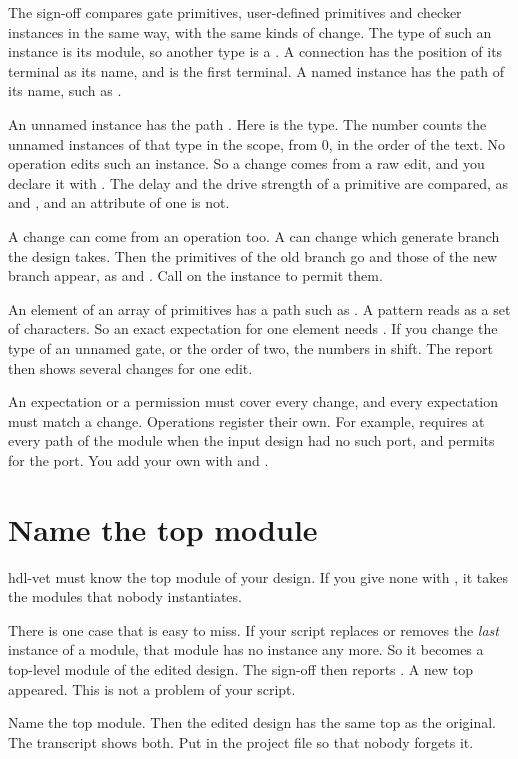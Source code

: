 The sign-off compares gate primitives, user-defined primitives and checker instances in
the same way, with the same kinds of change. The type of such an instance is its module,
so another type is a . A connection has the position of its terminal
as its name, and  is the first terminal. A named instance has the path of its
name, such as .

An unnamed instance has the path . Here  is the type. The
number counts the unnamed instances of that type in the scope, from 0, in the order of the
text. No operation edits such an instance. So a change comes from a raw edit, and you
declare it with . The delay and the drive strength of a primitive are
compared, as  and , and an attribute of
one is not.

A change can come from an operation too. A  can change which
generate branch the design takes. Then the primitives of the old branch go and those of the
new branch appear, as  and . Call
 on the instance to permit them.

An element of an array of primitives has a path such as . A pattern reads
\code{[0]} as a set of characters. So an exact expectation for one element needs
. If you change the type of an unnamed gate, or the order of two, the
numbers in  shift. The report then shows several changes for one edit.

An expectation or a permission must cover every change, and every
expectation must match a change. Operations register their own. For example,
 requires  at every path of the module when the
input design had no such port, and permits  for the port. You add your own with 
and .

\section{Name the top module}

hdl-vet must know the top module of your design. If you give none with
, it takes the modules that nobody instantiates.

There is one case that is easy to miss. If your
script replaces or removes the \emph{last} instance of a module, that module has no
instance any more. So it becomes a top-level module of the edited design. The
sign-off then reports . A new top appeared. This is not a
problem of your script.

Name the top module. Then the edited design has the same top as the original. The
transcript shows both. Put  in the project file so
that nobody forgets it.


